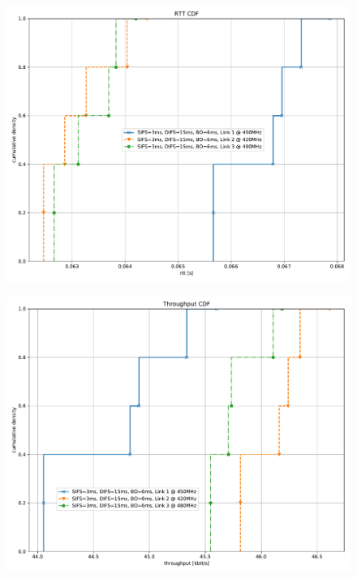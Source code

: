 \documentclass{article}
\begin{document}
\begin{figure}
	\includegraphics[width=\textwidth]{rb_high_single/cdf/rtt_cdf}
\end{figure}

\begin{figure}
	\includegraphics[width=\textwidth]{rb_high_single/cdf/throughput_cdf}
\end{figure}
\end{document}
